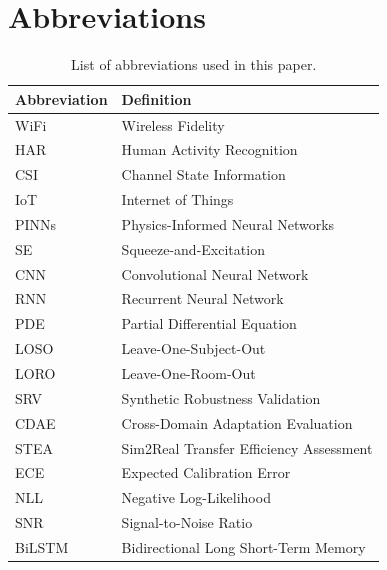 \documentclass[lettersize,journal]{IEEEtran}
\begin{document}
\section{Abbreviations}
\begin{table}[h]
\centering
\caption{List of abbreviations used in this paper.}
\label{tab:abbreviations}
\small
\begin{tabular}{@{}ll@{}}
\toprule
\textbf{Abbreviation} & \textbf{Definition} \\
\midrule
WiFi & Wireless Fidelity \\
HAR & Human Activity Recognition \\
CSI & Channel State Information \\
IoT & Internet of Things \\
PINNs & Physics-Informed Neural Networks \\
SE & Squeeze-and-Excitation \\
CNN & Convolutional Neural Network \\
RNN & Recurrent Neural Network \\
PDE & Partial Differential Equation \\
LOSO & Leave-One-Subject-Out \\
LORO & Leave-One-Room-Out \\
SRV & Synthetic Robustness Validation \\
CDAE & Cross-Domain Adaptation Evaluation \\
STEA & Sim2Real Transfer Efficiency Assessment \\
ECE & Expected Calibration Error \\
NLL & Negative Log-Likelihood \\
SNR & Signal-to-Noise Ratio \\
BiLSTM & Bidirectional Long Short-Term Memory \\
\bottomrule
\end{tabular}
\end{table}



\end{document}
